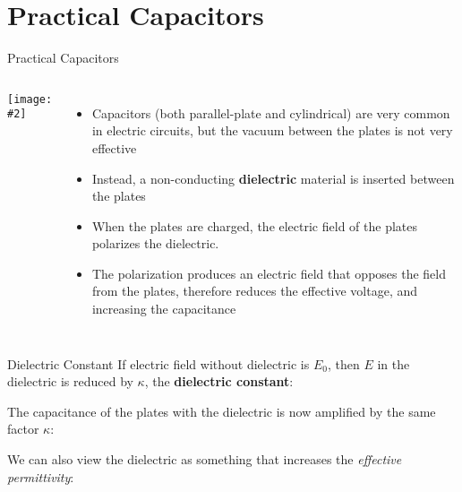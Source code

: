 \documentclass[12pt,aspectratio=169]{beamer}
\newcommand{\pic}[2]{\texttt{[image: \#2]}}
\newcommand{\eq}[2]{\vspace{#1}{\Large\begin{displaymath}#2\end{displaymath}}}
\begin{document}
\section{Practical Capacitors}

\begin{frame}{Practical Capacitors}
  \begin{columns}
    \pic{1.15}{Figure_20_05_05a}

    \begin{itemize}
    \item Capacitors (both parallel-plate and cylindrical) are very common in
      electric circuits, but the vacuum between the plates is not very effective
    \item Instead, a non-conducting \textbf{dielectric} material is inserted
      between the plates
    \item When the plates are charged, the electric field of the plates
      polarizes the dielectric.
    \item The polarization  produces an electric field that opposes the field
      from the plates, therefore reduces the effective voltage, and increasing
      the capacitance
    \end{itemize}
  \end{columns}
\end{frame}



\begin{frame}{Dielectric Constant}
  If electric field without dielectric is $E_0$, then $E$ in the dielectric is
  reduced by $\kappa$, the \textbf{dielectric constant}:

  \eq{-.25in}{
    \boxed{\kappa=\frac{E_0}E}
  }

  The capacitance of the plates with the dielectric is now amplified by the
  same factor $\kappa$:

  \eq{-.3in}{
    \boxed{C=\kappa C_0}
  }

  We can also view the dielectric as something that increases the
  \emph{effective permittivity}:
  
  \eq{-.3in}{
    \boxed{\epsilon=\kappa\epsilon_0}
  }
\end{frame}
\end{document}
